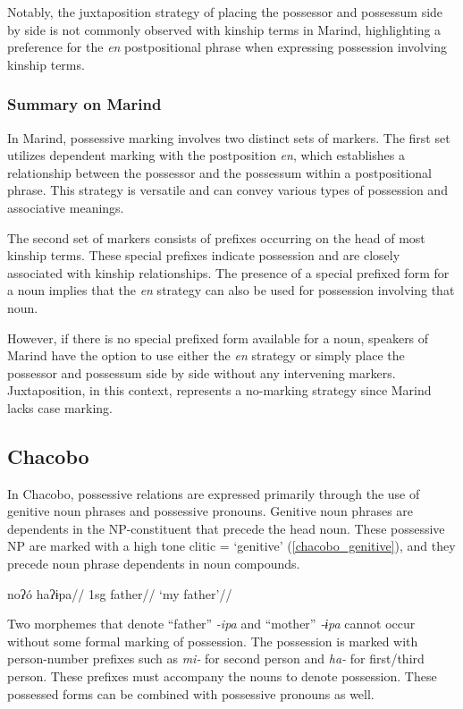 Notably, the juxtaposition strategy of placing the possessor and possessum side by side is not commonly observed with kinship terms in Marind, highlighting a preference for the \textit{en} postpositional phrase when expressing possession involving kinship terms.

\subsubsection*{Summary on Marind}

In Marind, possessive marking involves two distinct sets of markers. The first set utilizes dependent marking with the postposition \textit{en}, which establishes a relationship between the possessor and the possessum within a postpositional phrase. This strategy is versatile and can convey various types of possession and associative meanings.

The second set of markers consists of prefixes occurring on the head of most kinship terms. These special prefixes indicate possession and are closely associated with kinship relationships. The presence of a special prefixed form for a noun implies that the \textit{en} strategy can also be used for possession involving that noun.

However, if there is no special prefixed form available for a noun, speakers of Marind have the option to use either the \textit{en} strategy or simply place the possessor and possessum side by side without any intervening markers. Juxtaposition, in this context, represents a no-marking strategy since Marind lacks case marking.

\subsection{Chacobo}

In Chacobo, possessive relations are expressed primarily through the use of genitive noun phrases and possessive pronouns. Genitive noun phrases are dependents in the NP-constituent that precede the head noun. These possessive NP are marked with a high tone clitic =\textasciiacute{} `genitive' (\ref{chacobo_genitive}), and they precede noun phrase dependents in noun compounds. 

\ex
\label{chacobo_genitive}
\begingl
\gla noʔó haʔɨpa//
\glb 1sg father//
\glft `my father'//
\endgl
\xe

Two morphemes that denote ``father'' \textit{-ipa} and ``mother'' \textit{-ɨpa} cannot occur without some formal marking of possession. The possession is marked with person-number prefixes such as \textit{mi-} for second person and \textit{ha-} for first/third person. These prefixes must accompany the nouns to denote possession. These possessed forms can be combined with possessive pronouns as well.

